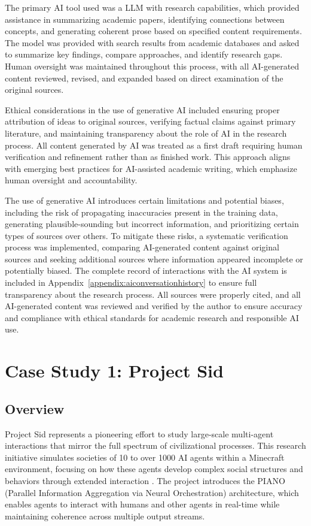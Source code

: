 \documentclass[a4paper, 12pt]{article}
\begin{document}
The primary AI tool used was a LLM with research capabilities, which provided assistance in summarizing academic papers, identifying connections between concepts, and generating coherent prose based on specified content requirements. The model was provided with search results from academic databases and asked to summarize key findings, compare approaches, and identify research gaps. Human oversight was maintained throughout this process, with all AI-generated content reviewed, revised, and expanded based on direct examination of the original sources.

Ethical considerations in the use of generative AI included ensuring proper attribution of ideas to original sources, verifying factual claims against primary literature, and maintaining transparency about the role of AI in the research process. All content generated by AI was treated as a first draft requiring human verification and refinement rather than as finished work. This approach aligns with emerging best practices for AI-assisted academic writing, which emphasize human oversight and accountability.

The use of generative AI introduces certain limitations and potential biases, including the risk of propagating inaccuracies present in the training data, generating plausible-sounding but incorrect information, and prioritizing certain types of sources over others. To mitigate these risks, a systematic verification process was implemented, comparing AI-generated content against original sources and seeking additional sources where information appeared incomplete or potentially biased. The complete record of interactions with the AI system is included in Appendix~\ref{appendix:aiconversationhistory} to ensure full transparency about the research process. All sources were properly cited, and all AI-generated content was reviewed and verified by the author to ensure accuracy and compliance with ethical standards for academic research and responsible AI use.

\section{Case Study 1: Project Sid}

\subsection{Overview}

Project Sid represents a pioneering effort to study large-scale multi-agent interactions that mirror the full spectrum of civilizational processes. This research initiative simulates societies of 10 to over 1000 AI agents within a Minecraft environment, focusing on how these agents develop complex social structures and behaviors through extended interaction \autocite{al2024projectsidmanyagentsimulations}. The project introduces the PIANO (Parallel Information Aggregation via Neural Orchestration) architecture, which enables agents to interact with humans and other agents in real-time while maintaining coherence across multiple output streams.
\end{document}
